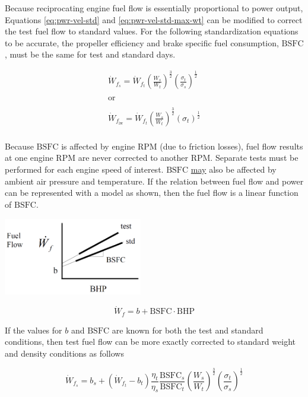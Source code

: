 \documentclass[
]{book}
\begin{document}
Because reciprocating engine fuel flow is essentially proportional to power
output, Equations \eqref{eq:pwr-vel-std} and \eqref{eq:pwr-vel-std-max-wt} can
be modified to correct the test fuel flow to standard values. For the following
standardization equations to be accurate, the propeller efficiency and brake
specific fuel consumption, \(\mathrm{BSFC}\), must be the same for test and
standard days.

\[
\begin{align}
\dot{W}_{f_s} = \dot{W}_{f_t} \left( \frac{W_s}{W_t} \right)^{\frac{3}{2}} \left( \frac{\sigma_t}{\sigma_s} \right)^{\frac{1}{2}} \\
\\
\text{or} \\
\\
\dot{W}_{f_{\text{iw}}} = \dot{W}_{f_t} \left( \frac{W_s}{W_t} \right)^{\frac{3}{2}} \left( \sigma_t \right)^{\frac{1}{2}} \\
\end{align}
\label{eq:fuel-flow-std}
\]

Because \(\mathrm{BSFC}\) is affected by engine \(\mathrm{RPM}\) (due to
friction losses), fuel flow results at one engine \(\mathrm{RPM}\) are never
corrected to another \(\mathrm{RPM}\). Separate tests must be performed for each
engine speed of interest. \(\mathrm{BSFC}\) \underline{may} also be affected
by ambient air pressure and temperature. If the relation between fuel flow and
power can be represented with a model as shown, then the fuel flow is a linear
function of \(\mathrm{BSFC}\).

\includegraphics[width=2.38542in,height=1.33542in]{media/12/fuel-flow-power-curve.png}

\[
\dot{W}_f = b + \mathrm{BSFC} \cdot \mathrm{BHP}
\]

If the values for \(b\) and \(\mathrm{BSFC}\) are known for both the test and
standard conditions, then test fuel flow can be more exactly corrected to
standard weight and density conditions as follows

\[
\dot{W}_{f_s} = b_s + \left( \dot{W}_{f_t} - b_t \right) \frac{\eta_t}{\eta_s} \frac{\mathrm{BSFC}_s}{\mathrm{BSFC}_t} \left( \frac{W_s}{W_t} \right)^{\frac{3}{2}} \left( \frac{\sigma_t}{\sigma_s} \right)^{\frac{1}{2}}
\label{eq:fuel-flow-std-bsfc}
\]
\end{document}
